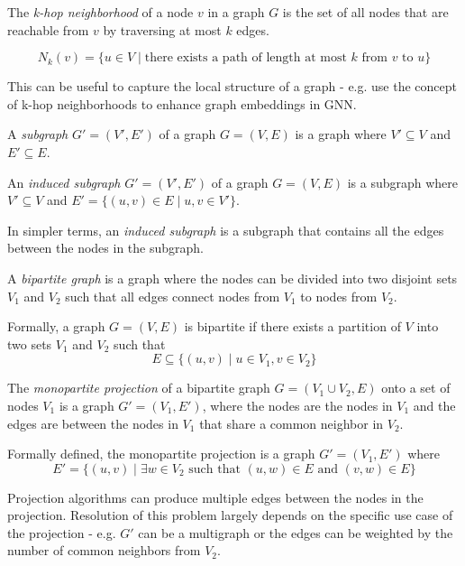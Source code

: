 \begin{definition}
    The \textit{k-hop neighborhood} of a node $v$ in a graph $G$ is the set of all nodes that are reachable from $v$ by traversing at most $k$ edges.

    $$
    N_k(v) = \{ u \in V \mid \text{there exists a path of length at most $k$ from $v$ to $u$} \}
    $$

    This can be useful to capture the local structure of a graph 
    - e.g. \cite{nikolentzos2019khop} use the concept of k-hop neighborhoods to enhance graph embeddings in \ac{GNN}.
\end{definition}

\begin{definition}[Subgraph]
    A \textit{subgraph} $G' = (V', E')$ of a graph $G = (V, E)$ is a graph where $V' \subseteq V$ and $E' \subseteq E$.
\end{definition}

\begin{definition}
    An \textit{induced subgraph} $G' = (V', E')$ of a graph $G = (V, E)$ is a subgraph where $V' \subseteq V$ and $E' = \{ (u, v) \in E \mid u, v \in V' \}$.

    In simpler terms, an \textit{induced subgraph} is a subgraph that contains all the edges between the nodes in the subgraph.
\end{definition}

\begin{definition}
    A \textit{bipartite graph} is a graph where the nodes can be divided into two disjoint sets $V_1$ and $V_2$ such that all edges connect nodes from $V_1$ to nodes from $V_2$.
    
    Formally, a graph $G = (V, E)$ is bipartite if there exists a partition of $V$ into two sets $V_1$ and $V_2$ such that
    $$E \subseteq \{ (u, v) \mid u \in V_1, v \in V_2 \}$$
\end{definition}

\begin{definition}\label{def:monopartite-projection}
    The \textit{monopartite projection} of a bipartite graph $G = (V_1 \cup V_2, E)$ onto a set of nodes $V_1$ is a graph $G' = (V_1, E')$, 
    where the nodes are the nodes in $V_1$ and the edges are between the nodes in $V_1$ that share a common neighbor in $V_2$.
    
    Formally defined, the monopartite projection is a graph $G' = (V_1, E')$ where
    $$
    E' = \{ (u, v) \mid \exists w \in V_2 \text{ such that } (u, w) \in E \text{ and } (v, w) \in E \}
    $$

    Projection algorithms can produce multiple edges between the nodes in the projection.
    Resolution of this problem largely depends on the specific use case of the projection - e.g. $G'$ can be a multigraph or the edges can be weighted by the number of common neighbors from $V_2$.
    
\end{definition}
